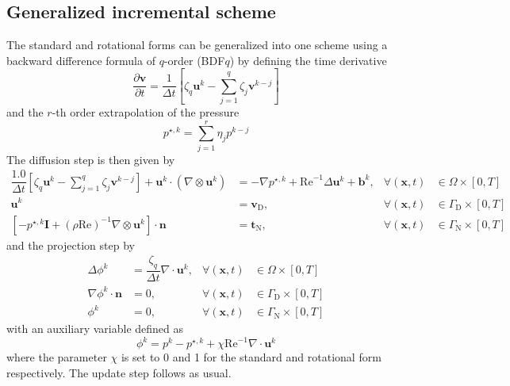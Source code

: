 \documentclass[]{scrartcl}
\newcommand{\pfrac}[2]{\frac{\partial #1}{\partial #2}}
\begin{document}
\subsection{Generalized incremental scheme}
The standard and rotational forms can be generalized into one scheme using a backward difference formula of $q$-order (BDF$q$) by defining the time derivative
\begin{equation*}
	\pfrac{\mathbf{v}}{t} = \dfrac{1}{\Delta t}\left[ \zeta_q \mathbf{u}^{k} - \sum_{j=1}^{q} \zeta_j \mathbf{v}^{k-j}\right]
\end{equation*}
and the $r$-th order extrapolation of the pressure 
\begin{equation*}
	p^{\star, k} = \sum_{j=1}^{r} \eta_j p^{k-j}
\end{equation*}
The diffusion step is then given by
\begin{equation*}
	\begin{aligned}
		\dfrac{1.0}{\Delta t} \left[\zeta_q \mathbf{u}^{k} - \sum_{j=1}^{q} \zeta_j \mathbf{v}^{k-j}\right]  + \mathbf{u}^{k} \cdot (\nabla \otimes \mathbf{u}^{k}) &= -\nabla	p^{\star, k} +  \mathrm{Re}^{-1} \Delta \mathbf{u}^{k} + \mathbf{b}^{k}, &\forall (\mathbf{x}, t) &\in \Omega \times \left[0, T \right]  \\
		\mathbf{u}^{k} &= \mathbf{v}_\textrm{D}, &\forall (\mathbf{x}, t) &\in \Gamma_\textrm{D} \times \left[0, T \right] \\
		[-	p^{\star, k} \mathbf{I} + (\rho\textrm{Re})^{-1}\nabla \otimes \mathbf{u}^{k}]\cdot \mathbf{n} &= \mathbf{t}_\textrm{N}, &\forall \left(\mathbf{x}, t\right) &\in \Gamma_\textrm{N} \times \left[0, T \right]
	\end{aligned}
\end{equation*}
and the projection step by
\begin{equation*}
	\begin{aligned}
		\Delta \phi^{k} &= \dfrac{\zeta_q}{\Delta t} \nabla \cdot \mathbf{u}^{k},  &\forall (\mathbf{x}, t) &\in \Omega \times \left[0, T \right] \\
		\nabla \phi^{k} \cdot \mathbf{n} &= 0, &\forall (\mathbf{x}, t) &\in \Gamma_\textrm{D} \times \left[0, T \right] \\
		\phi^{k} &= 0, &\forall\left(\mathbf{x}, t\right) &\in \Gamma_\textrm{N} \times \left[0, T \right]
	\end{aligned}
\end{equation*}
with an auxiliary variable defined as
\begin{equation*}
	\phi^{k} = p^{k} - p^{\star, k} + \chi\textrm{Re}^{-1} \nabla \cdot \mathbf{u}^{k}
\end{equation*}
where the parameter $\chi$ is set to 0 and 1 for the standard and rotational form respectively. The update step follows as usual.
\end{document}
